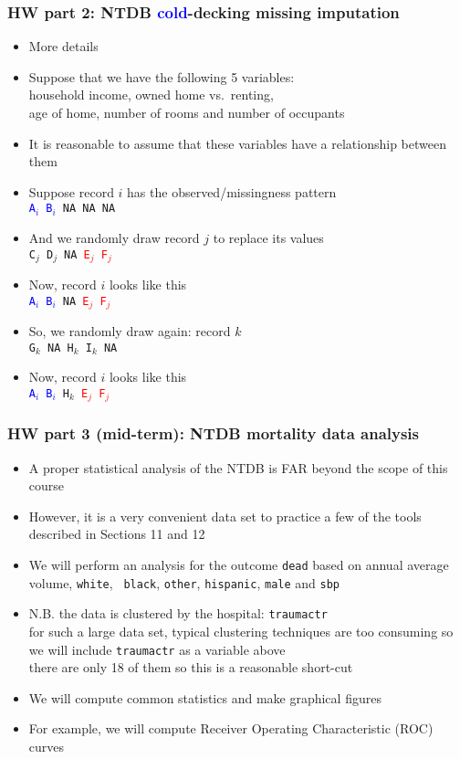 \documentclass[11pt,pdftex,dvipsnames,usenames,helvetica]{beamer}
\newcommand*{\blue}[1]{\textcolor{blue}{#1}}
\begin{document}
\begin{frame}[fragile]
\frametitle{HW part 2: NTDB \blue{cold}-decking missing imputation}

\begin{itemize}
\item More details
\item Suppose that we have the following 5 variables:\\ 
household income, owned home vs.\ renting,\\ 
age of home, number of rooms and number of occupants
\item It is reasonable to assume that these variables have a relationship
between them
\item Suppose record $i$ has the observed/missingness pattern\\
{\tt \textcolor{blue}{A$_i$ B$_i$} NA NA NA}
\item And we randomly draw record $j$ to replace its values\\
{\tt C$_{j}$ D$_{j}$ NA \textcolor{red}{E$_{j}$ F$_{j}$}}
\item Now, record $i$ looks like this\\
{\tt \textcolor{blue}{A$_i$ B$_i$} NA \textcolor{red}{E$_{j}$ F$_{j}$}}
\item So, we randomly draw again: record $k$\\
{\tt G$_{k}$ NA H$_{k}$ I$_{k}$ NA}
\item Now, record $i$ looks like this\\
{\tt \textcolor{blue}{A$_i$ B$_i$} H$_{k}$ \textcolor{red}{E$_{j}$ F$_{j}$}}
\end{itemize}

\end{frame}

\begin{frame}[fragile]
\frametitle{HW part 3 (mid-term): NTDB mortality data analysis}

\begin{itemize}
\item A proper statistical analysis of the NTDB is FAR beyond the
  scope of this course
\item However, it is a very convenient data set to practice a 
few of the tools described in Sections 11 and 12
\item We will perform an analysis for the outcome {\tt dead} based on 
annual average volume, {\tt white}, {\tt
    black}, {\tt other}, {\tt hispanic}, {\tt male} and {\tt sbp}
\item N.B. the data is clustered by the hospital: {\tt traumactr}\\
for such a large data set, typical clustering techniques are too
consuming so we will include {\tt traumactr} as a variable above\\
there are only 18 of them so this is a reasonable short-cut
\item We will compute common statistics and make graphical figures
\item For example, we will compute Receiver Operating Characteristic
(ROC) curves
\end{itemize}

\end{frame}
\end{document}
